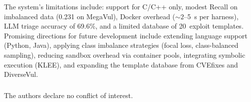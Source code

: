 \documentclass[runningheads]{llncs}
\begin{document}
The system's limitations include: support for C/C++ only, modest Recall on imbalanced data (0.231 on MegaVul), Docker overhead (${\sim}2$--5~s per harness), LLM triage accuracy of 69.6\%, and a limited database of 20~exploit templates. Promising directions for future development include extending language support (Python, Java), applying class imbalance strategies (focal loss, class-balanced sampling), reducing sandbox overhead via container pools, integrating symbolic execution (KLEE), and expanding the template database from CVEfixes and DiverseVul.


%
\begin{credits}
\subsubsection{\discintname}
The authors declare no conflict of interest.
\end{credits}
%
%
\end{document}

